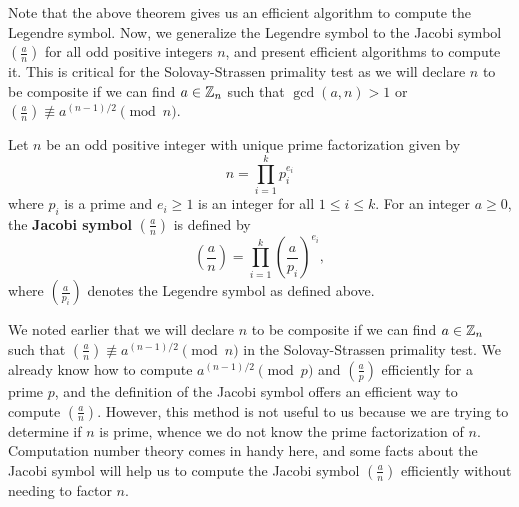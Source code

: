 Note that the above theorem gives us an efficient algorithm to compute the Legendre symbol. 
Now, we generalize the Legendre symbol to the Jacobi symbol $\left(\frac an\right)$ for all odd positive integers 
$n$, and present efficient algorithms to compute it. This is critical for the Solovay-Strassen 
primality test as we will declare $n$ to be composite if we can find $a \in \mathbb{Z}_n$ such that 
$\gcd(a, n) > 1$ or $\left(\frac an\right) \not\equiv a^{(n-1)/2} \pmod n$. 

\begin{defn}
Let $n$ be an odd positive integer with unique prime factorization given by 
\[ n = \prod_{i=1}^k p_i^{e_i} \]
where $p_i$ is a prime and $e_i \geq 1$ is an integer for all $1 \leq i \leq k$. 
For an integer $a \geq 0$, the {\bf Jacobi symbol} $\left(\frac an\right)$ is defined by 
\[ \left( \frac an \right) = \prod_{i=1}^k \left( \frac a{p_i} \right)^{\!e_i}, \]
where $(\frac a{p_i})$ denotes the Legendre symbol as defined above. 
\end{defn}

We noted earlier that we will declare $n$ to be composite if we can find $a \in \mathbb{Z}_n$ such that 
$\left(\frac an\right) \not\equiv a^{(n-1)/2} \pmod n$ in the Solovay-Strassen primality test. We already 
know how to compute $a^{(n-1)/2} \pmod p$ and $(\frac ap)$ efficiently for a prime $p$, and 
the definition of the Jacobi symbol offers an efficient way to compute $\left(\frac an\right)$. 
However, this method is not useful to us because we are trying to determine if $n$ is prime, 
whence we do not know the prime factorization of $n$. Computation number theory comes in 
handy here, and some facts about the Jacobi symbol will help us to compute the Jacobi symbol
$\left(\frac an\right)$ efficiently without needing to factor $n$.

